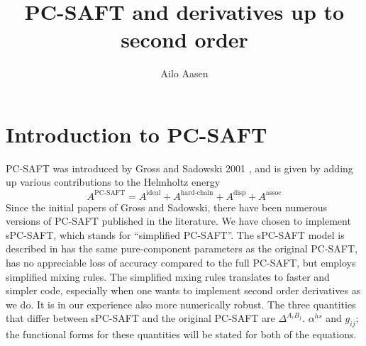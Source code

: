 \documentclass[internal,english]{sintefmemo2012}
\title{PC-SAFT and derivatives up to second order}
\author{Ailo Aasen}
\begin{document}
\frontmatter
\tableofcontents

\section{Introduction to PC-SAFT}
PC-SAFT was introduced by Gross and Sadowski 2001 \cite{Gross01,Gross02}, and is given by adding up various contributions to the Helmholtz energy
\begin{equation}
  \label{eq:PC-SAFT}
  A^{\text{PC-SAFT}} = A^{\text{ideal}} + A^{\text{hard-chain}} + A^{\text{disp}} + A^{\text{assoc}}
\end{equation}
Since the initial papers of Gross and Sadowski, there have been numerous
versions of PC-SAFT published in the literature. We have chosen to implement
sPC-SAFT, which stands for ``simplified PC-SAFT''. The sPC-SAFT model is
described in \cite{Kontogeorgis10} has the same pure-component parameters as the
original PC-SAFT, has no appreciable loss of accuracy compared to the full
PC-SAFT, but employs simplified mixing rules. The simplified mxing rules
translates to faster and simpler code, especially when one wants to implement
second order derivatives as we do. It is in our experience also more numerically
robust. The three quantities that differ between sPC-SAFT and the original
PC-SAFT are $\Delta^{A_i B_j}$. $\alpha^{hs}$ and $g_{ij}$; the functional forms
for these quantities will be stated for both of the equations.
\end{document}

